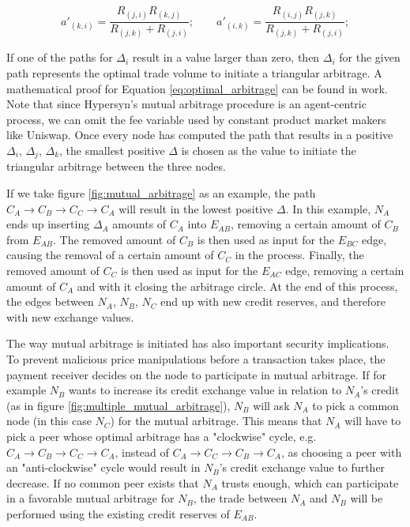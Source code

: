 \documentclass{article}
\begin{document}
\begin{equation}
\label{eq:optimal_arbitrage_elaboration1}
        a'_{(k,i)} = \frac{R_{(j,i)} R_{(k,j)}}{R_{(j,k)} + R_{(j,i)}}; \qquad a'_{(i,k)} = \frac{R_{(i,j)} R_{(j,k)}}{R_{(j,k)} +  R_{(j,i)}};
\end{equation}

If one of the paths for $\Delta_i$ result in a value larger than zero, then $\Delta_i$ for the given path represents the optimal trade volume to initiate a triangular arbitrage. A mathematical proof for Equation \ref{eq:optimal_arbitrage} can be found in \cite{wang_cyclic_2022} work. Note that since Hypersyn's mutual arbitrage procedure is an agent-centric process, we can omit the fee variable used by constant product market makers like Uniswap. Once every node has computed the path that results in a positive $\Delta_i$, $\Delta_j$, $\Delta_k$, the smallest positive $\Delta$ is chosen as the value to initiate the triangular arbitrage between the three nodes.

If we take figure \ref{fig:mutual_arbitrage} as an example, the path $C_A \rightarrow C_B \rightarrow C_C \rightarrow C_A$ will result in the lowest positive $\Delta$. In this example, $N_A$ ends up inserting $\Delta_A$ amounts of $C_A$ into $E_{AB}$, removing a certain amount of $C_B$ from $E_{AB}$. The removed amount of $C_B$ is then used as input for the $E_{BC}$ edge, causing the removal of a certain amount of $C_C$ in the process. Finally, the removed amount of $C_C$ is then used as input for the $E_{AC}$ edge, removing a certain amount of $C_A$ and with it closing the arbitrage circle. At the end of this process, the edges between $N_A$, $N_B$, $N_C$ end up with new credit reserves, and therefore with new exchange values.

The way mutual arbitrage is initiated has also important security implications. To prevent malicious price manipulations before a transaction takes place, the payment receiver decides on the node to participate in mutual arbitrage. If for example $N_B$ wants to increase its credit exchange value in relation to $N_A$'s credit (as in figure \ref{fig:multiple_mutual_arbitrage}), $N_B$ will ask $N_A$ to pick a common node (in this case $N_C$) for the mutual arbitrage. This means that $N_A$ will have to pick a peer whose optimal arbitrage has a "clockwise" cycle, e.g. $C_A \rightarrow C_B \rightarrow C_C \rightarrow C_A$, instead of $C_A \rightarrow C_C \rightarrow C_B \rightarrow C_A$, as choosing a peer with an "anti-clockwise" cycle would result in $N_B$'s credit exchange value to further decrease. If no common peer exists that $N_A$ trusts enough, which can participate in a favorable mutual arbitrage for $N_B$, the trade between $N_A$ and $N_B$ will be performed using the existing credit reserves of $E_{AB}$.
\end{document}
